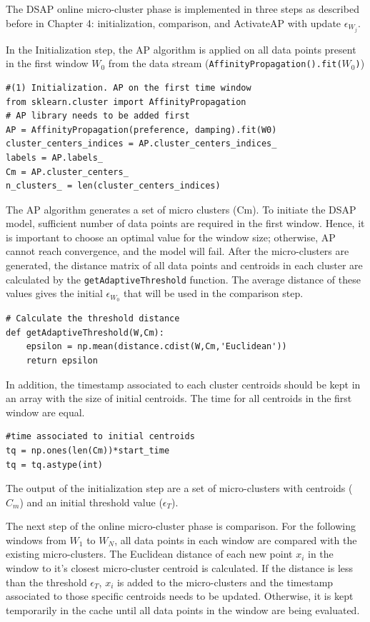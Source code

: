 The DSAP online micro-cluster phase is implemented in three steps as described before in Chapter 4: initialization, comparison, and ActivateAP with update $\epsilon_{W_j}$.

In the Initialization step, the AP algorithm is applied on all data points present in the first window $W_0$ from the data stream (\texttt{AffinityPropagation().fit($W_0$)})

\begin{lstlisting}
#(1) Initialization. AP on the first time window
from sklearn.cluster import AffinityPropagation 
# AP library needs to be added first
AP = AffinityPropagation(preference, damping).fit(W0)
cluster_centers_indices = AP.cluster_centers_indices_
labels = AP.labels_
Cm = AP.cluster_centers_
n_clusters_ = len(cluster_centers_indices)
\end{lstlisting}

The AP algorithm generates a set of micro clusters (Cm). To initiate the DSAP model, sufficient number of data points are required in the first window. Hence, it is important to choose an optimal value for the window size; otherwise, AP cannot reach convergence, and the model will fail. After the micro-clusters are generated, the distance matrix of all data points and centroids in each cluster are calculated by the \texttt{getAdaptiveThreshold} function. The average distance of these values gives the initial $\epsilon_{W_0}$ that will be used in the comparison step.


\begin{lstlisting}
# Calculate the threshold distance
def getAdaptiveThreshold(W,Cm):
    epsilon = np.mean(distance.cdist(W,Cm,'Euclidean'))
    return epsilon 
\end{lstlisting}

In addition, the timestamp associated to each cluster centroids should be kept in an array with the size of initial centroids. The time for all centroids in the first window are equal.

\begin{lstlisting}
#time associated to initial centroids
tq = np.ones(len(Cm))*start_time
tq = tq.astype(int)
\end{lstlisting}


The output of the initialization step are a set of micro-clusters with centroids ($C_m$) and an initial threshold value ($\epsilon_T$).

The next step of the online micro-cluster phase is comparison. For the following windows from $W_1$ to $W_N$, all data points in each window are compared with the existing micro-clusters. The Euclidean distance of each new point $x_i$ in the window to it's closest micro-cluster centroid is calculated. If the distance is less than the threshold $\epsilon_T$, $x_i$ is added to the micro-clusters and the timestamp associated to those specific centroids needs to be updated. Otherwise, it is kept temporarily in the cache until all data points in the window are being evaluated. 

